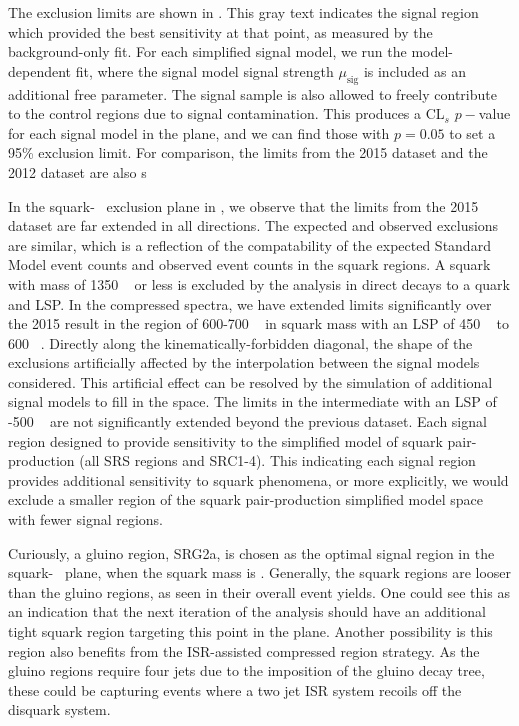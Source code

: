 The exclusion limits are shown in .
This gray text indicates the signal region which provided the best sensitivity at that point, as measured by the background-only fit.
For each simplified signal model, we run the model-dependent fit, where the signal model signal strength $\mu_{\mathrm{sig}}$ is included as an additional free parameter.
The signal sample is also allowed to freely contribute to the control regions due to signal contamination.
This produces a CL$_s$ $p-$value for each signal model in the plane, and we can find those with $p = 0.05$ to set a 95\% exclusion limit.
For comparison, the limits from the 2015 dataset and the 2012 dataset are also s

In the squark-\lsp~ exclusion plane in , we observe that the limits from the 2015 dataset are far extended in all directions.
The expected and observed exclusions are similar, which is a reflection of the compatability of the expected Standard Model event counts and observed event counts in the squark regions.
A squark with mass of 1350 \GeV~ or less is excluded by the analysis in direct decays to a quark and LSP.
In the compressed spectra, we have extended limits significantly over the 2015 result in the region of 600-700 \GeV~ in squark mass with an LSP of 450 \GeV~ to 600 \GeV~.
Directly along the kinematically-forbidden diagonal, the shape of the exclusions artificially affected by the interpolation between the signal models considered.
This artificial effect can be resolved by the simulation of additional signal models to fill in the space.
The limits in the intermediate with an LSP of -500 \GeV~ are not significantly extended beyond the previous dataset.
Each signal region designed to provide sensitivity to the simplified model of squark pair-production (all SRS regions and SRC1-4).
This indicating each signal region provides additional sensitivity to squark phenomena, or more explicitly, we would exclude a smaller region of the squark pair-production simplified model space with fewer signal regions.

Curiously, a gluino region, SRG2a, is chosen as the optimal signal region in the squark-\lsp~ plane, when the squark mass is  \GeV.
Generally, the squark regions are looser than the gluino regions, as seen in their overall event yields.
One could see this as an indication that the next iteration of the analysis should have an additional tight squark region targeting this point in the plane.
Another possibility is this region also benefits from the ISR-assisted compressed region strategy.
As the gluino regions require four jets due to the imposition of the gluino decay tree, these could be capturing events where a two jet ISR system recoils off the disquark system.

